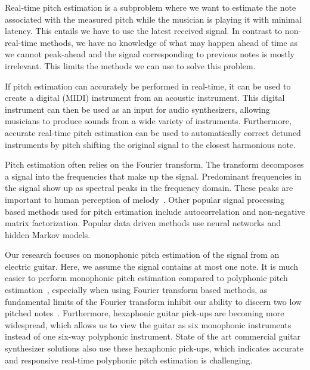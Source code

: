 \documentclass[a4paper,10pt,twocolumn]{article}
\begin{document}
Real-time pitch estimation is a subproblem where we want to estimate the note associated with the measured pitch while the musician is playing it with minimal latency. This entails we have to use the latest received signal. In contrast to non-real-time methods, we have no knowledge of what may happen ahead of time as we cannot peak-ahead and the signal corresponding to previous notes is mostly irrelevant. This limits the methods we can use to solve this problem.

If pitch estimation can accurately be performed in real-time, it can be used to create a digital (MIDI) instrument from an acoustic instrument. This digital instrument can then be used as an input for audio synthesizers, allowing musicians to produce sounds from a wide variety of instruments. Furthermore, accurate real-time pitch estimation can be used to automatically correct detuned instruments by pitch shifting the original signal to the closest harmonious note.

Pitch estimation often relies on the Fourier transform. The transform decomposes a signal into the frequencies that make up the signal. Predominant frequencies in the signal show up as spectral peaks in the frequency domain. These peaks are important to human perception of melody~\cite{hearing}. %
Other popular signal processing based methods used for pitch estimation include autocorrelation and non-negative matrix factorization. Popular data driven methods use neural networks and hidden Markov models.

Our research focuses on monophonic pitch estimation of the signal from an electric guitar. Here, we assume the signal contains at most one note. It is much easier to perform monophonic pitch estimation compared to polyphonic pitch estimation~\cite{monotopoly}, especially when using Fourier transform based methods, as fundamental limits of the Fourier transform inhibit our ability to discern two low pitched notes~\cite{nopoly}. Furthermore, hexaphonic guitar pick-ups are becoming more widespread, which allows us to view the guitar as six monophonic instruments instead of one six-way polyphonic instrument. State of the art commercial guitar synthesizer solutions also use these hexaphonic pick-ups, which indicates accurate and responsive real-time polyphonic pitch estimation is challenging.
\end{document}
